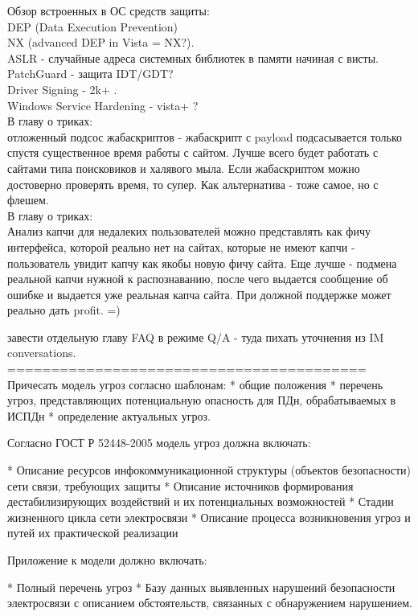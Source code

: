 Обзор встроенных в ОС средств защиты:\\

DEP (Data Execution Prevention)\\
NX (advanced DEP in Vista = NX?).\\
ASLR - случайные адреса системных библиотек в памяти начиная с висты.\\
PatchGuard - защита IDT/GDT?\\
Driver Signing - 2k+ .\\
Windows Service Hardening - vista+ ?\\

В главу о триках:\\
отложенный подсос жабаскриптов - жабаскрипт с payload подсасывается только спустя существенное время работы с сайтом. Лучше всего будет работать с сайтами типа поисковиков и халявого мыла. Если жабаскриптом можно достоверно проверять время, то супер. Как альтернатива - тоже самое, но с флешем.\\

В главу о триках:\\
Анализ капчи для недалеких пользователей можно представлять как фичу интерфейса, которой реально нет на сайтах,
которые не имеют капчи - пользователь увидит капчу как якобы новую фичу сайта. Еще лучше - подмена реальной
капчи нужной к распознаванию, после чего выдается сообщение об ошибке и выдается уже реальная капча сайта. При должной поддержке может реально дать profit. =)

завести отдельную главу FAQ в режиме Q/A - туда пихать уточнения из IM conversations.\\

=========================================\\
Причесать модель угроз согласно шаблонам:
    * общие положения
    * перечень угроз, представляющих потенциальную опасность для ПДн, обрабатываемых в ИСПДн
    * определение актуальных угроз.


Согласно ГОСТ Р 52448-2005 модель угроз должна включать:

    * Описание ресурсов инфокоммуникационной структуры (объектов безопасности) сети связи, требующих защиты
    * Описание источников формирования дестабилизирующих воздействий и их потенциальных возможностей
    * Стадии жизненного цикла сети электросвязи
    * Описание процесса возникновения угроз и путей их практической реализации

Приложение к модели должно включать:

    * Полный перечень угроз
    * Базу данных выявленных нарушений безопасности электросвязи с описанием обстоятельств, связанных с обнаружением нарушением.


